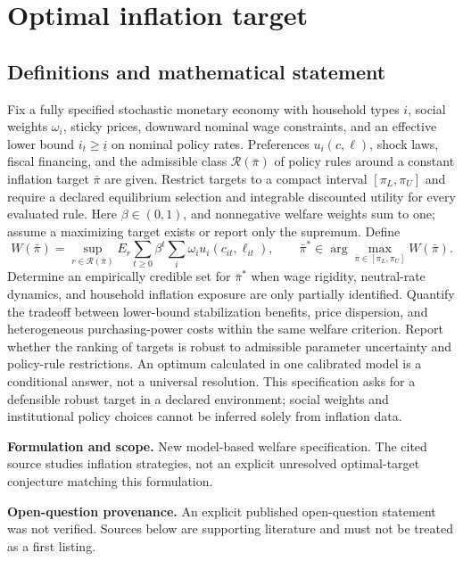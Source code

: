 \documentclass[11pt]{article}
\begin{document}
\section*{Optimal inflation target}\label{30007528}
\subsection{Definitions and mathematical statement}
Fix a fully specified stochastic monetary economy with household types \(i\), social weights \(\omega_i\), sticky prices, downward nominal wage constraints, and an effective lower bound \(i_t\ge\underline i\) on nominal policy rates. Preferences \(u_i(c,\ell)\), shock laws, fiscal financing, and the admissible class \(\mathcal R(\bar\pi)\) of policy rules around a constant inflation target \(\bar\pi\) are given. Restrict targets to a compact interval \([\pi_L,\pi_U]\) and require a declared equilibrium selection and integrable discounted utility for every evaluated rule. Here \(\beta\in(0,1)\), and nonnegative welfare weights sum to one; assume a maximizing target exists or report only the supremum.
Define
\[
W(\bar\pi)=\sup_{r\in\mathcal R(\bar\pi)}
E_r\sum_{t\ge0}\beta^t\sum_i\omega_i u_i(c_{it},\ell_{it}),\qquad
\bar\pi^*\in\arg\max_{\bar\pi\in[\pi_L,\pi_U]}W(\bar\pi).
\]
Determine an empirically credible set for \(\bar\pi^*\) when wage rigidity, neutral-rate dynamics, and household inflation exposure are only partially identified. Quantify the tradeoff between lower-bound stabilization benefits, price dispersion, and heterogeneous purchasing-power costs within the same welfare criterion. Report whether the ranking of targets is robust to admissible parameter uncertainty and policy-rule restrictions. An optimum calculated in one calibrated model is a conditional answer, not a universal resolution. This specification asks for a defensible robust target in a declared environment; social weights and institutional policy choices cannot be inferred solely from inflation data.

\par\textbf{Formulation and scope.} New model-based welfare specification. The cited source studies inflation strategies, not an explicit unresolved optimal-target conjecture matching this formulation.

\par\textbf{Open-question provenance.} An explicit published open-question statement was not verified. Sources below are supporting literature and must not be treated as a first listing.
\end{document}
